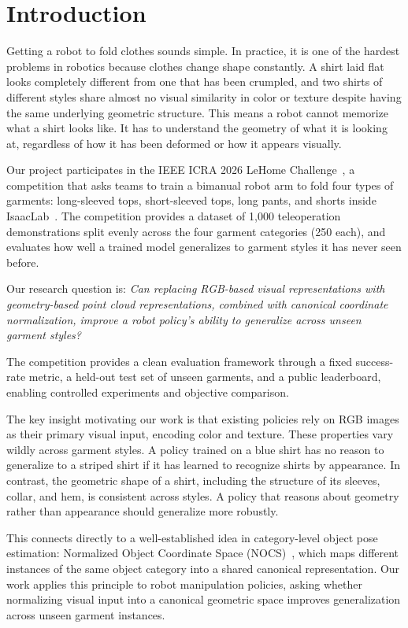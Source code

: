 \section{Introduction}

Getting a robot to fold clothes sounds simple. In practice, it is one of the hardest problems in robotics because clothes change shape constantly. A shirt laid flat looks completely different from one that has been crumpled, and two shirts of different styles share almost no visual similarity in color or texture despite having the same underlying geometric structure. This means a robot cannot memorize what a shirt looks like. It has to understand the geometry of what it is looking at, regardless of how it has been deformed or how it appears visually.

Our project participates in the IEEE ICRA 2026 LeHome Challenge~\cite{lehome2026}, a competition that asks teams to train a bimanual robot arm to fold four types of garments: long-sleeved tops, short-sleeved tops, long pants, and shorts inside IsaacLab~\cite{mittal2023orbit}. The competition provides a dataset of 1,000 teleoperation demonstrations split evenly across the four garment categories (250 each), and evaluates how well a trained model generalizes to garment styles it has never seen before.

Our research question is: \textit{Can replacing RGB-based visual representations with geometry-based point cloud representations, combined with canonical coordinate normalization, improve a robot policy's ability to generalize across unseen garment styles?}

The competition provides a clean evaluation framework through a fixed success-rate metric, a held-out test set of unseen garments, and a public leaderboard, enabling controlled experiments and objective comparison.

The key insight motivating our work is that existing policies rely on RGB images as their primary visual input, encoding color and texture. These properties vary wildly across garment styles. A policy trained on a blue shirt has no reason to generalize to a striped shirt if it has learned to recognize shirts by appearance. In contrast, the geometric shape of a shirt, including the structure of its sleeves, collar, and hem, is consistent across styles. A policy that reasons about geometry rather than appearance should generalize more robustly.

This connects directly to a well-established idea in category-level object pose estimation: Normalized Object Coordinate Space (NOCS)~\cite{wang2019normalized}, which maps different instances of the same object category into a shared canonical representation. Our work applies this principle to robot manipulation policies, asking whether normalizing visual input into a canonical geometric space improves generalization across unseen garment instances.

